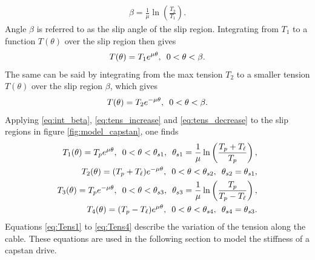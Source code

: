 \documentclass[twocolumn,10pt]{asme2ej}
\newcommand{\hquad}{\hspace{0.5em}}
\begin{document}
\begin{align} 
\beta = \frac{1}{\mu}\ln\left(\frac{T_2}{T_1}\right).
\label{eq:int_beta}
\end{align}
Angle $\beta$ is referred to as the slip angle of the slip region. Integrating from $T_1$ to a function $T(\theta)$ over the slip region then gives \begin{align}
T(\theta) = T_1e^{\mu\theta},\hquad 0<\theta<\beta.\label{eq:tens_increase}
\end{align}
The same can be said by integrating from the max tension $T_2$ to a smaller tension $T(\theta)$ over the slip region $\beta$, which gives
\begin{align}
T(\theta) = T_2e^{-\mu\theta},\hquad 0<\theta<\beta.\label{eq:tens_decrease}
\end{align}
Applying \eqref{eq:int_beta}, \eqref{eq:tens_increase} and \eqref{eq:tens_decrease} to the slip regions in figure \ref{fig:model_capstan}, one finds
\begin{align}
    T_1(\theta) = T_pe^{\mu\theta},\hquad 0<\theta<\theta_{s1},\hquad \theta_{s1} = \frac{1}{\mu}\ln\left(\frac{T_p+T_\ell}{T_p}\right),\label{eq:Tens1}\\
    T_2(\theta) = (T_p+T_\ell)e^{-\mu\theta},\hquad 0<\theta<\theta_{s2},\hquad \theta_{s2}=\theta_{s1},\label{eq:Tens2}\\
    T_3(\theta) = T_pe^{-\mu\theta},\hquad 0<\theta<\theta_{s3},\hquad \theta_{s3} = \frac{1}{\mu}\ln\left(\frac{T_p}{T_p-T_\ell}\right),\label{eq:Tens3}\\
    T_4(\theta) = (T_p-T_\ell)e^{\mu\theta},\hquad 0<\theta<\theta_{s4},\hquad \theta_{s4} = \theta_{s3}.\label{eq:Tens4}
\end{align}
Equations \eqref{eq:Tens1} to \eqref{eq:Tens4} describe the variation of the tension along the cable. These equations are used in the following section to model the stiffness of a capstan drive.
\end{document}
